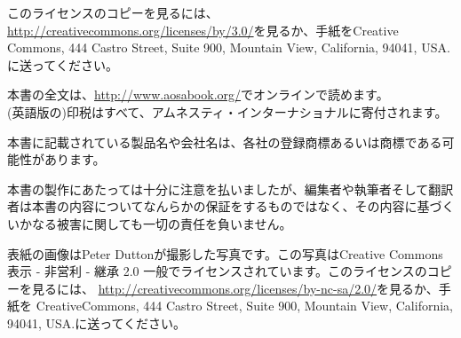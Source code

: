 \noindent このライセンスのコピーを見るには、
\url{http://creativecommons.org/licenses/by/3.0/}を見るか、手紙をCreative
Commons, 444 Castro Street, Suite 900, Mountain View, California,
94041, USA.に送ってください。\\

\vspace{0.15cm}

\noindent
本書の全文は、\url{http://www.aosabook.org/}でオンラインで読めます。\\
(英語版の)印税はすべて、アムネスティ・インターナショナルに寄付されます。\\

\vfill

\noindent 本書に記載されている製品名や会社名は、各社の登録商標あるいは商標である可能性があります。\\

\vspace{0.15cm}

\noindent 本書の製作にあたっては十分に注意を払いましたが、編集者や執筆者そして翻訳者は本書の内容についてなんらかの保証をするものではなく、その内容に基づくいかなる被害に関しても一切の責任を負いません。\\

\vspace{0.15cm}

\noindent 表紙の画像はPeter Duttonが撮影した写真です。この写真はCreative Commons表示 - 非営利 - 継承 2.0 一般でライセンスされています。このライセンスのコピーを見るには、
\url{http://creativecommons.org/licenses/by-nc-sa/2.0/}を見るか、手紙を
CreativeCommons, 444 Castro Street, Suite 900, Mountain View, California,
94041, USA.に送ってください。\\

